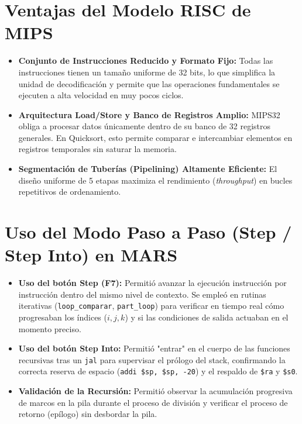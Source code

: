 \documentclass[12pt,a4paper]{article}
\begin{document}
	
	\section{Ventajas del Modelo RISC de MIPS}
	
	\begin{itemize}
		\item \textbf{Conjunto de Instrucciones Reducido y Formato Fijo:} Todas las instrucciones tienen un tamaño uniforme de 32 bits, lo que simplifica la unidad de decodificación y permite que las operaciones fundamentales se ejecuten a alta velocidad en muy pocos ciclos.
		\item \textbf{Arquitectura Load/Store y Banco de Registros Amplio:} MIPS32 obliga a procesar datos únicamente dentro de su banco de 32 registros generales. En Quicksort, esto permite comparar e intercambiar elementos en registros temporales sin saturar la memoria.
		\item \textbf{Segmentación de Tuberías (Pipelining) Altamente Eficiente:} El diseño uniforme de 5 etapas maximiza el rendimiento (\textit{throughput}) en bucles repetitivos de ordenamiento.
	\end{itemize}
	
	
	\section{Uso del Modo Paso a Paso (Step / Step Into) en MARS}
	
	\begin{itemize}
		\item \textbf{Uso del botón Step (F7):} Permitió avanzar la ejecución instrucción por instrucción dentro del mismo nivel de contexto. Se empleó en rutinas iterativas (\texttt{loop\_comparar}, \texttt{part\_loop}) para verificar en tiempo real cómo progresaban los índices ($i, j, k$) y si las condiciones de salida actuaban en el momento preciso.
		\item \textbf{Uso del botón Step Into:} Permitió "entrar" en el cuerpo de las funciones recursivas tras un \texttt{jal} para supervisar el prólogo del stack, confirmando la correcta reserva de espacio (\texttt{addi \$sp, \$sp, -20}) y el respaldo de \texttt{\$ra} y \texttt{\$s0}.
		\item \textbf{Validación de la Recursión:} Permitió observar la acumulación progresiva de marcos en la pila durante el proceso de división y verificar el proceso de retorno (epílogo) sin desbordar la pila.
	\end{itemize}
	
\end{document}
